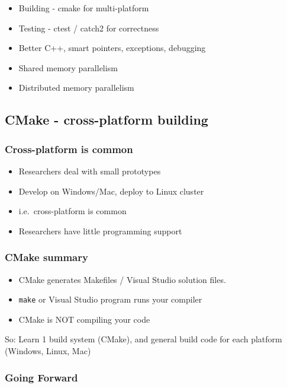 \begin{itemize}
\itemsep1pt\parskip0pt
\item
  Building - cmake for multi-platform
\item
  Testing - ctest / catch2 for correctness
\item
  Better C++, smart pointers, exceptions, debugging
\item
  Shared memory parallelism
\item
  Distributed memory parallelism
\end{itemize}

\subsection{CMake - cross-platform
building}\label{cmake---cross-platform-building}

\subsubsection{Cross-platform is common}\label{cross-platform-is-common}

\begin{itemize}
\itemsep1pt\parskip0pt
\item
  Researchers deal with small prototypes
\item
  Develop on Windows/Mac, deploy to Linux cluster
\item
  i.e.~cross-platform is common
\item
  Researchers have little programming support
\end{itemize}

\subsubsection{CMake summary}\label{cmake-summary}

\begin{itemize}
\itemsep1pt\parskip0pt
\item
  CMake generates Makefiles / Visual Studio solution files.
\item
  \texttt{make} or Visual Studio program runs your compiler
\item
  CMake is NOT compiling your code
\end{itemize}

So: Learn 1 build system (CMake), and general build code for each
platform (Windows, Linux, Mac)

\subsubsection{Going Forward}\label{going-forward}

